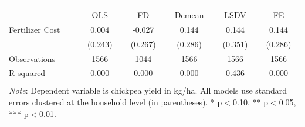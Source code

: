 \begin{tabular}{l*{5}{c}} 
\\[-1.8ex]\hline \hline \\[-1.8ex] 
& \multicolumn{1}{c}{OLS} & 
\multicolumn{1}{c}{FD} & 
\multicolumn{1}{c}{Demean} & 
\multicolumn{1}{c}{LSDV} & 
\multicolumn{1}{c}{FE} \\ \midrule
\midrule
Fertilizer Cost     &       0.004         &      -0.027         &       0.144         &       0.144         &       0.144         \\
                    &     (0.243)         &     (0.267)         &     (0.286)         &     (0.351)         &     (0.286)         \\
\midrule
Observations        &        1566         &        1044         &        1566         &        1566         &        1566         \\
R-squared           &       0.000         &       0.000         &       0.000         &       0.436         &       0.000         \\
\hline \hline \\[-1.8ex] 
\multicolumn{6}{p{\linewidth}}{\small 
\noindent \textit{Note}: Dependent variable 
is chickpea yield in kg/ha. All models use 
standard errors clustered at the 
household level (in parentheses). 
* p$<$0.10, ** p$<$0.05, *** p$<$0.01.} 
\end{tabular}
